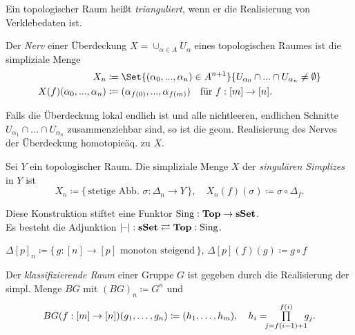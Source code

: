 \documentclass{cheat-sheet}
\newcommand{\nspace}[1]{\foreach \i in {1,...,#1}{ \! }} %
\DeclareMathOperator{\Sing}{Sing} %
\begin{document}
\begin{defn}
  Ein topologischer Raum heißt \emph{trianguliert}, wenn er die Realisierung von Verklebedaten ist.
\end{defn}

\begin{defn}
  Der \emph{Nerv} einer Überdeckung $X = \cup_{\alpha \in A} U_\alpha$ eines topologischen Raumes ist die simpliziale Menge
  \begin{align*}
    X_n & \coloneqq \Set{(\alpha_0, \nldots, \alpha_n) \in A^{n+1}}{ U_{\alpha_0} \cap \nldots \cap U_{\alpha_n} \not= \emptyset } \\
    X(f)(\alpha_0, \nldots, \alpha_n) & \coloneqq (\alpha_{f(0)}, \nldots, \alpha_{f(m)}) \quad \text{für } f : [m] \to [n].
  \end{align*}
\end{defn}

\begin{bem}
  Falls die Überdeckung lokal endlich ist und alle nichtleeren, endlichen Schnitte $U_{\alpha_1} \cap \ldots \cap U_{\alpha_n}$ zusammenziehbar sind, so ist die geom. Realisierung des Nerves der Überdeckung homotopieäq. zu $X$.
\end{bem}

\begin{defn}
  Sei $Y$ ein topologischer Raum. Die simpliziale Menge $X$ der \emph{singulären Simplizes} in $Y$ ist
  \[
    X_n \coloneqq \{ \, \text{stetige Abb. } \sigma : \Delta_n \to Y \, \}, \quad
    X_n(f)(\sigma) \coloneqq \sigma \circ \Delta_f.
  \]
\end{defn}

\begin{bem}
  Diese Konstruktion stiftet eine Funktor $\Sing : \Top \to \sSet$. \\
  Es besteht die Adjunktion \enspace $\abs{\blank} : \sSet \rightleftarrows \Top : \Sing$.
\end{bem}

\begin{defn}
  $\Delta[p]_n \coloneqq \{ \, g : [n] \to [p] \text{ monoton steigend} \, \}$, $\Delta[p](f)(g) \coloneqq g \circ f$
\end{defn}

\begin{defn}
  Der \emph{klassifizierende Raum} einer Gruppe $G$ ist gegeben durch die Realisierung der simpl. Menge $BG$ mit $(BG)_n \coloneqq G^n$ und
  \begin{align*}
    BG(f : [m] \to [n])(g_1, \ldots, g_n) \coloneqq
    (h_1, \ldots, h_m), \quad h_i = \nspace{3} \prod_{j=f(i-1)+1}^{f(i)} \nspace{3} g_j.
  \end{align*}
\end{defn}
\end{document}
